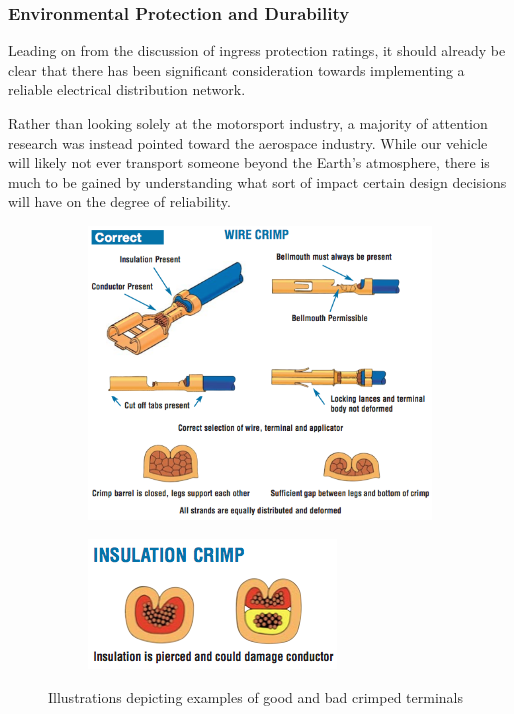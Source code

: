 \subsubsection{Environmental Protection and Durability}

Leading on from the discussion of ingress protection ratings, it should already be clear that there has been significant consideration towards implementing a reliable electrical distribution network.

Rather than looking solely at the motorsport industry, a majority of attention research was instead pointed toward the aerospace industry.  While our vehicle will likely not ever transport someone beyond the Earth's atmosphere, there is much to be gained by understanding what sort of impact certain design decisions will have on the degree of reliability.

\begin{figure}
	\centering
	\begin{subfigure}[b]{0.4\textwidth}
		\centering
		\includegraphics{good_crimp_illustration.png}
	\end{subfigure}
	\begin{subfigure}[b]{0.4\textwidth}
		\centering
		\includegraphics{bad_crimp_illustration.png}
	\end{subfigure}
	\caption{Illustrations depicting examples of good and bad crimped terminals}
	\label{fig:bad_crimp}
\end{figure}

